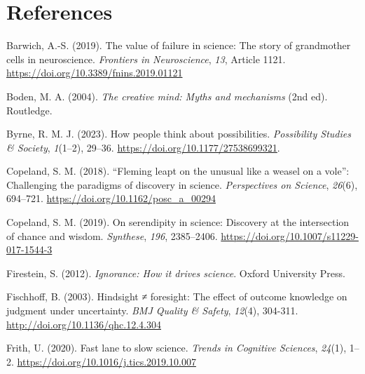 \documentclass[authordate, commentary]{jote-new-article}
\begin{document}
  





	\section{References}







	Barwich, A.-S. (2019). The value of failure in science: The story of grandmother cells in neuroscience. \emph{Frontiers in Neuroscience}, \emph{13}, Article 1121. \href{https://doi.org/10.3389/fnins.2019.01121}{https://doi.org/10.3389/fnins.2019.01121}



	Boden, M. A. (2004). \emph{The creative mind: Myths and mechanisms} (2nd ed). Routledge.



	Byrne, R. M. J. (2023). How people think about possibilities. \emph{Possibility Studies \& Society}, \emph{1}(1--2), 29--36. \href{https://doi.org/10.1177/27538699321}{https://doi.org/10.1177/27538699321}.



	Copeland, S. M. (2018). “Fleming leapt on the unusual like a weasel on a vole”: Challenging the paradigms of discovery in science. \emph{Perspectives on Science}, \emph{26}(6), 694--721. \href{https://doi.org/10.1162/posc\_a\_00294}{https://doi.org/10.1162/posc\_a\_00294}



	Copeland, S. M. (2019). On serendipity in science: Discovery at the intersection of chance and wisdom. \emph{Synthese}, \emph{196}, 2385--2406. \href{https://doi.org/10.1007/s11229-017-1544-3}{https://doi.org/10.1007/s11229-017-1544-3}



	Firestein, S. (2012). \emph{Ignorance: How it drives science}. Oxford University Press.



	Fischhoff, B. (2003). Hindsight ≠ foresight: The effect of outcome knowledge on judgment under uncertainty. \emph{BMJ Quality \& Safety}, \emph{12}(4), 304-311. \href{http://doi.org/10.1136/qhc.12.4.304Frith}{http://doi.org/10.1136/qhc.12.4.304}
	
	Frith, U. (2020). Fast lane to slow science. \emph{Trends in Cognitive Sciences}, \emph{24}(1), 1--2. \href{https://doi.org/10.1016/j.tics.2019.10.007}{https://\allowbreak doi.org/10.1016/j.tics.2019.10.007}
\end{document}
